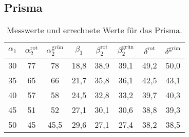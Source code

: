 \subsection{Prisma}
\label{sec:Prisma}

\begin{table}
	\centering
	\caption{Messwerte und errechnete Werte für das Prisma.}
	\label{tab:messwerte-brechungssgesetz}
	\begin{tabular}{c c c c c c c c}
		\toprule
		$\alpha_1$ &
		$\alpha_2^\text{rot}$ &
		$\alpha_2^\text{grün}$ &
		$\beta_1$ &
		$\beta_2^\text{rot}$ &
		$\beta_2^\text{grün}$ &
		$\delta^\text{rot}$ &
		$\delta^\text{grün}$ \\
		\midrule
		30 & 77 & 78   & 18,8 & 38,9 & 39,1 & 49,2 & 50,0	\\
		35 & 65 & 66   & 21,7 & 35,8 & 36,1 & 42,5 & 43,1	\\
		40 & 57 & 58   & 24,5 & 32,8 & 33,2 & 39,7 & 40,3	\\
		45 & 51 & 52   & 27,1 & 30,1 & 30,6 & 38,8 & 39,3	\\
		50 & 45 & 45,5 & 29,6 & 27,1 & 27,4 & 38,2 & 38,5	\\
		\bottomrule
	\end{tabular}
\end{table}

